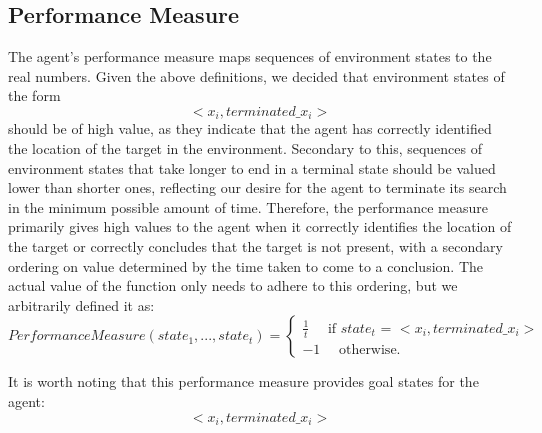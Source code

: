 \subsection{Performance Measure}\label{sssection:PerfMeas}
The agent's performance measure maps sequences of environment states to the real numbers. Given the above definitions, we decided that environment states of the form
\[ <x_i, terminated\_x_i> \]
should be of high value, as they indicate that the agent has correctly identified the location of the target in the environment. Secondary to this, sequences of environment states that take longer to end in a terminal state should be valued lower than shorter ones, reflecting our desire for the agent to terminate its search in the minimum possible amount of time. Therefore, the performance measure primarily gives high values to the agent when it correctly identifies the location of the target or correctly concludes that the target is not present, with a secondary ordering on value determined by the time taken to come to a conclusion. The actual value of the function only needs to adhere to this ordering, but we arbitrarily defined it as:
\[
Performance Measure(state_1,..., state_t) = 
\begin{cases}
\frac{1}{t} \quad \text{ if } state_t \text{ = } <x_i, terminated\_x_i>
\\
-1 \quad \text { otherwise. }
\end{cases}
\]


It is worth noting that this performance measure provides goal states for the agent:
\[ <x_i, terminated\_x_i> \]